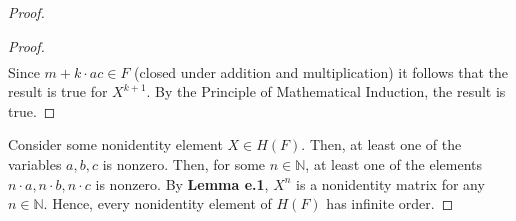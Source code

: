 \documentclass[12pt]{article}
\newcommand{\N}{\mathbb{N}}
\newenvironment{lemma}[2][Lemma]{\begin{trivlist} \item[\hskip \labelsep {\bfseries #1}\hskip \labelsep {\bfseries #2.}]}{\end{trivlist}}
\newenvironment{problem}[2][Problem]{\begin{trivlist} \item[\hskip \labelsep {\bfseries #1}\hskip \labelsep {\bfseries #2.}]}{\end{trivlist}}
\begin{document}
\begin{problem}{11}
\begin{enumerate}
\begin{proof}
\begin{lemma}{e.1}
\begin{proof}
\begin{align*}
\end{align*}
Since $m+k\cdot ac\in F$ (closed under addition and multiplication) it follows that the result is true for $X^{k+1}$. By the Principle of Mathematical Induction, the result is true.
\end{proof}
\end{lemma}
Consider some nonidentity element $X\in H(F)$. Then, at least one of the variables $a,b,c$ is nonzero. Then, for some $n\in \N$, at least one of the elements $n\cdot a, n\cdot b, n\cdot c$ is nonzero. By \textbf{Lemma e.1}, $X^{n}$ is a nonidentity matrix for any $n\in \N$. Hence, every nonidentity element of $H(F)$ has infinite order.
\end{proof}
\end{enumerate}
\end{problem}
       
\end{document}
